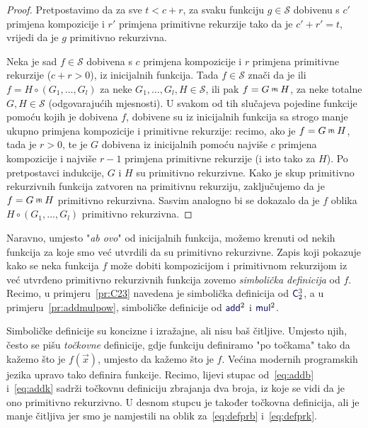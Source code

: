 \begin{proof}
Pretpostavimo da za sve $t<c+r$, za svaku funkciju $g\in\mathcal S$ dobivenu s $c'$ primjena kompozicije i $r'$ primjena primitivne rekurzije tako da je $c'+r'=t$, vrijedi da je $g$ primitivno rekurzivna.

Neka je sad $f\in\mathcal S$ dobivena s $c$ primjena kompozicije i $r$ primjena primitivne rekurzije ($c+r>0$), iz inicijalnih funkcija. Tada $f\in\mathcal S$ znači da je ili $f=H\circ(G_1,\dotsc,G_l)$ za neke $G_1,\dotsc,G_l,H\in\mathcal S$, ili pak $f=G\pr H$, za neke totalne $G,H\in\mathcal S$ (odgovarajućih mjesnosti). U svakom od tih slučajeva pojedine funkcije pomoću kojih je dobivena $f$, dobivene su iz inicijalnih funkcija sa strogo manje ukupno primjena kompozicije i primitivne rekurzije: recimo, ako je $f=G\pr H$, tada je $r>0$, te je $G$ dobivena iz inicijalnih pomoću najviše $c$ primjena kompozicije i najviše $r-1$ primjena primitivne rekurzije (i isto tako za $H$). Po pretpostavci indukcije, $G$ i $H$ su primitivno rekurzivne. Kako je skup primitivno rekurzivnih funkcija zatvoren na primitivnu rekurziju, zaključujemo da je $f=G\pr H$ primitivno rekurzivna. Sasvim analogno bi se dokazalo da je $f$ oblika $H\circ(G_1,\dotsc,G_l)$ primitivno rekurzivna.
\end{proof}

\begin{napomena}\label{nap:symbdef}
Naravno, umjesto "\emph{ab ovo}" od inicijalnih funkcija, možemo krenuti od nekih funkcija za koje smo već utvrdili da su primitivno rekurzivne. Zapis koji pokazuje kako se neka funkcija $f$ može dobiti kompozicijom i primitivnom rekurzijom iz već utvrđeno primitivno rekurzivnih funkcija zovemo \emph{simbolička definicija} od $f$. Recimo, u primjeru~\ref{pr:C23} navedena je simbolička definicija od $\f C_2^3$, a u primjeru~\ref{pr:addmulpow}, simboličke definicije od $\f{add}^2$ i $\f{mul}^2$.
\end{napomena}

Simboličke definicije su koncizne i izražajne, ali nisu baš čitljive. Umjesto njih, često se pišu \emph{točkovne} definicije, gdje funkciju definiramo "po točkama" tako da kažemo što je $f(\vec x)$, umjesto da kažemo što je $f$. Većina modernih programskih jezika upravo tako definira funkcije. Recimo, lijevi stupac od~\eqref{eq:addb} i~\eqref{eq:addk} sadrži točkovnu definiciju zbrajanja dva broja, iz koje se vidi da je ono primitivno rekurzivno. U desnom stupcu je također točkovna definicija, ali je manje čitljiva jer smo je namjestili na oblik za~\eqref{eq:defprb} i~\eqref{eq:defprk}.

